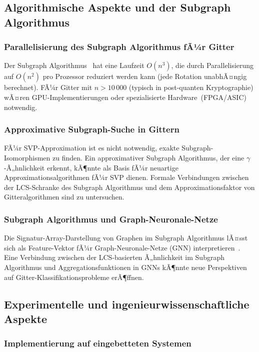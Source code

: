 ﻿\documentclass[a4paper,12pt]{article}
\theoremstyle{definition}
\begin{document}
\subsection{Algorithmische Aspekte und der Subgraph Algorithmus}

\subsubsection{Parallelisierung des Subgraph Algorithmus fÃ¼r Gitter}

Der Subgraph Algorithmus~\cite{Epp2026Subgraph} hat eine Laufzeit $O(n^3)$,
die durch Parallelisierung auf $O(n^2)$ pro Prozessor reduziert werden kann
(jede Rotation unabhÃ¤ngig berechnet).
FÃ¼r Gitter mit $n > 10\,000$ (typisch in post-quanten Kryptographie)
wÃ¤ren GPU-Implementierungen oder spezialisierte Hardware~(FPGA/ASIC) notwendig.

\subsubsection{Approximative Subgraph-Suche in Gittern}

FÃ¼r SVP-Approximation ist es nicht notwendig, exakte Subgraph-Isomorphismen zu finden.
Ein approximativer Subgraph Algorithmus, der eine $\gamma$-Ã„hnlichkeit erkennt,
kÃ¶nnte als Basis fÃ¼r neuartige Approximationsalgorithmen fÃ¼r SVP dienen.
Formale Verbindungen zwischen der LCS-Schranke des Subgraph Algorithmus
und dem Approximationsfaktor von Gitteralgorithmen sind zu untersuchen.

\subsubsection{Subgraph Algorithmus und Graph-Neuronale-Netze}

Die Signatur-Array-Darstellung von Graphen im Subgraph Algorithmus
lÃ¤sst sich als Feature-Vektor fÃ¼r Graph-Neuronale-Netze (GNN) interpretieren~\cite{Xu2019}.
Eine Verbindung zwischen der LCS-basierten Ã„hnlichkeit im Subgraph Algorithmus
und Aggregationsfunktionen in GNNs kÃ¶nnte neue Perspektiven auf
Gitter-Klassifikationsprobleme erÃ¶ffnen.

\subsection{Experimentelle und ingenieurwissenschaftliche Aspekte}

\subsubsection{Implementierung auf eingebetteten Systemen}
\end{document}

